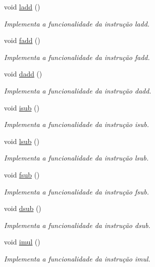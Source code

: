 \begin{DoxyCompactItemize}
void \hyperlink{classOperations_ad4b153d687baa98c26fcfe7c24e12f45}{ladd} ()
\begin{DoxyCompactList}\small\item\em Implementa a funcionalidade da instrução ladd. \end{DoxyCompactList}\item 
void \hyperlink{classOperations_a01a07c700f0f1574552437b76f3fdcb4}{fadd} ()
\begin{DoxyCompactList}\small\item\em Implementa a funcionalidade da instrução fadd. \end{DoxyCompactList}\item 
void \hyperlink{classOperations_a8a23241bed8c033ab75994a18bf2a702}{dadd} ()
\begin{DoxyCompactList}\small\item\em Implementa a funcionalidade da instrução dadd. \end{DoxyCompactList}\item 
void \hyperlink{classOperations_ab2808e99336de64fefb2a9073bc251de}{isub} ()
\begin{DoxyCompactList}\small\item\em Implementa a funcionalidade da instrução isub. \end{DoxyCompactList}\item 
void \hyperlink{classOperations_a32485b21761b1e5540a6575822a2661a}{lsub} ()
\begin{DoxyCompactList}\small\item\em Implementa a funcionalidade da instrução lsub. \end{DoxyCompactList}\item 
void \hyperlink{classOperations_a138cd74b7244e430085eb4850de2b481}{fsub} ()
\begin{DoxyCompactList}\small\item\em Implementa a funcionalidade da instrução fsub. \end{DoxyCompactList}\item 
void \hyperlink{classOperations_aa994b0cf4aead2646fa5bb90c2643664}{dsub} ()
\begin{DoxyCompactList}\small\item\em Implementa a funcionalidade da instrução dsub. \end{DoxyCompactList}\item 
void \hyperlink{classOperations_a01b2ffdd380327b31b03657eb99b8a81}{imul} ()
\begin{DoxyCompactList}\small\item\em Implementa a funcionalidade da instrução imul. \end{DoxyCompactList}\item 

\end{DoxyCompactItemize}
